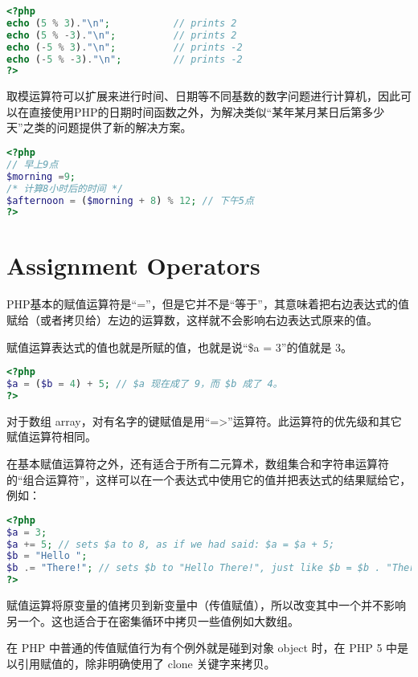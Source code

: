 \begin{lstlisting}[language=PHP]
<?php
echo (5 % 3)."\n";           // prints 2
echo (5 % -3)."\n";          // prints 2
echo (-5 % 3)."\n";          // prints -2
echo (-5 % -3)."\n";         // prints -2
?>
\end{lstlisting}

取模运算符可以扩展来进行时间、日期等不同基数的数字问题进行计算机，因此可以在直接使用PHP的日期时间函数之外，为解决类似“某年某月某日后第多少天”之类的问题提供了新的解决方案。

\begin{lstlisting}[language=PHP]
<?php
// 早上9点
$morning =9; 
/* 计算8小时后的时间 */
$afternoon = ($morning + 8) % 12; // 下午5点
?>
\end{lstlisting}

\section{Assignment Operators}

PHP基本的赋值运算符是“=”，但是它并不是“等于”，其意味着把右边表达式的值赋给（或者拷贝给）左边的运算数，这样就不会影响右边表达式原来的值。

赋值运算表达式的值也就是所赋的值，也就是说“\$a = 3”的值就是 3。



\begin{lstlisting}[language=PHP]
<?php
$a = ($b = 4) + 5; // $a 现在成了 9，而 $b 成了 4。
?>
\end{lstlisting}

对于数组 array，对有名字的键赋值是用“=>”运算符。此运算符的优先级和其它赋值运算符相同。

在基本赋值运算符之外，还有适合于所有二元算术，数组集合和字符串运算符的“组合运算符”，这样可以在一个表达式中使用它的值并把表达式的结果赋给它，例如：

\begin{lstlisting}[language=PHP]
<?php
$a = 3;
$a += 5; // sets $a to 8, as if we had said: $a = $a + 5;
$b = "Hello ";
$b .= "There!"; // sets $b to "Hello There!", just like $b = $b . "There!";
?>
\end{lstlisting}

赋值运算将原变量的值拷贝到新变量中（传值赋值），所以改变其中一个并不影响另一个。这也适合于在密集循环中拷贝一些值例如大数组。

在 PHP 中普通的传值赋值行为有个例外就是碰到对象 object 时，在 PHP 5 中是以引用赋值的，除非明确使用了 clone 关键字来拷贝。

